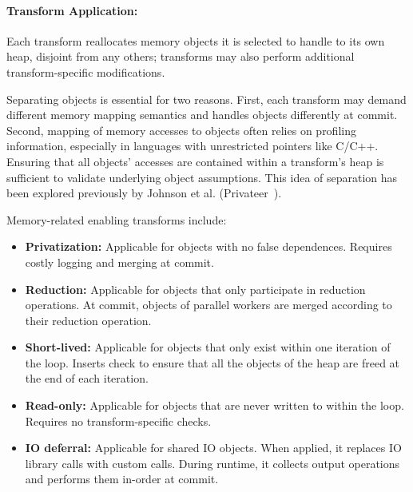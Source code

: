 \paragraph{Transform Application:}
Each transform reallocates
memory objects it is selected to handle
to its own heap, disjoint from any others; transforms may also
perform additional transform-specific modifications.

Separating objects is essential
for two reasons. First, each transform may demand different
memory mapping semantics and handles objects differently at commit.
Second, mapping of memory accesses to
objects often relies on profiling information, especially in languages with
unrestricted pointers like C/C++. Ensuring that all objects' accesses
are contained within a transform's heap is sufficient to
validate underlying object assumptions. This idea of separation has
been explored previously by Johnson et al. (Privateer~\cite{johnson:12:pldi}).

Memory-related enabling transforms include:

\begin{itemize}
%
  \item \textbf{Privatization:} Applicable for objects with no false dependences.
  Requires costly logging and merging at commit.

\item \textbf{Reduction:} Applicable for objects that only participate in
reduction operations. At commit, objects of parallel
workers are merged according to their reduction operation.




\item \textbf{Short-lived:} Applicable for objects that only exist within one
iteration of the loop. Inserts check to ensure that all
the objects of the heap are freed at the end of each iteration.

\item \textbf{Read-only:} Applicable for objects that are never written to within
the loop. Requires no transform-specific checks.

\item \textbf{IO deferral:} Applicable for shared IO objects. When applied, it
replaces IO library calls with custom calls. During runtime, it
collects output operations and performs them in-order at commit.

\end{itemize}

